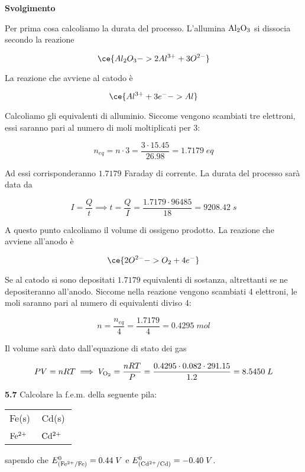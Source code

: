 \vspace{0.2cm}\large\textbf{Svolgimento}\normalsize

\vspace{0.2cm}Per prima cosa calcoliamo la durata del processo. L'allumina $\rm Al_2O_3$ si dissocia secondo la reazione 

$$\ce{Al_2O_3 -> 2Al^{3+} + 3O^{2-}}$$

La reazione che avviene al catodo è

$$\ce{Al^{3+} + 3e^- -> Al }$$

Calcoliamo gli equivalenti di alluminio. Siccome vengono scambiati tre elettroni, essi saranno pari al numero di moli moltiplicati per 3:

$$n_{eq}=n \cdot 3
=\frac{3 \cdot 15.45}{26.98}
=1.7179\;eq$$

Ad essi corrisponderanno $1.7179$ Faraday di corrente. La durata del processo sarà data da

$$I=\frac{Q}{t}
\implies
t=\frac{Q}{I}=\frac{1.7179 \cdot 96485}{18}
=9208.42\;s$$

A questo punto calcoliamo il volume di ossigeno prodotto. La reazione che avviene all'anodo è

$$\ce{2O^{2-} -> O_2 + 4e^-}$$

Se al catodo si sono depositati $1.7179$ equivalenti di sostanza, altrettanti se ne depositeranno all'anodo. Siccome nella reazione vengono scambiati 4 elettroni, le moli saranno pari al numero di equivalenti diviso 4:

$$n=\frac{n_{eq}}{4}
=\frac{1.7179}{4}
=0.4295\;mol$$

Il volume sarà dato dall'equazione di stato dei gas

$$PV=nRT
\implies
V_{\rm O_2}=\frac{nRT}{P}=\frac{0.4295 \cdot 0.082 \cdot 291.15}{1.2}=8.5450 \;L$$

\vspace{0.2cm}\textbf{5.7} Calcolare la f.e.m. della seguente pila:

\begin{center}
    \begin{tabular}{|p{3.7cm}||p{3.7cm}|}
         Fe(s) & Cd(s)\\[0.5ex]
         $\rm Fe^{2+}$ \, \big[0.0120 M\big] & $\rm Cd^{2+}$ \, \big[0.8988 M\big] \\[0.5ex]
    \end{tabular}
\end{center}

sapendo che $E^0_{(\rm Fe^{2+}/Fe)}=0.44\;V$ e $E^0_{(\rm Cd^{2+}/Cd)}=-0.40\;V$.

